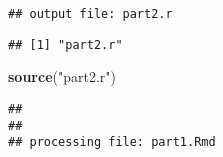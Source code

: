 \documentclass[]{article}
\newenvironment{Shaded}{\begin{snugshade}}{\end{snugshade}}
\newcommand{\KeywordTok}[1]{\textcolor[rgb]{0.13,0.29,0.53}{\textbf{#1}}}
\newcommand{\NormalTok}[1]{#1}
\newcommand{\StringTok}[1]{\textcolor[rgb]{0.31,0.60,0.02}{#1}}
\begin{document}
\begin{verbatim}
## output file: part2.r
\end{verbatim}

\begin{verbatim}
## [1] "part2.r"
\end{verbatim}

\begin{Shaded}
\begin{Highlighting}[]
\KeywordTok{source}\NormalTok{(}\StringTok{"part2.r"}\NormalTok{)}
\end{Highlighting}
\end{Shaded}

\begin{verbatim}
## 
## 
## processing file: part1.Rmd
\end{verbatim}
\end{document}
